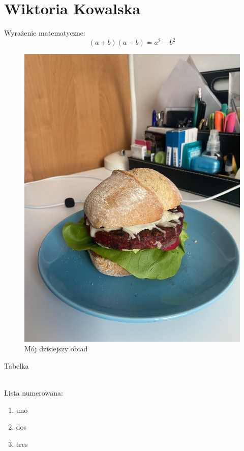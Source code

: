 \section {Wiktoria Kowalska}
Wyrażenie matematyczne: 
\[(a+b)(a-b)=a^2-b^2\]

\begin{figure} [htbp]
    \centering
    \includegraphics[angle=270,scale=0.05]{pictures/burgerek.jpeg}
    \caption{Mój dzisiejszy obiad}
\end{figure}

Tabelka

\\


Lista numerowana:
\begin{enumerate}
    \item uno
    \item dos
    \item tres
\end{enumerate}


